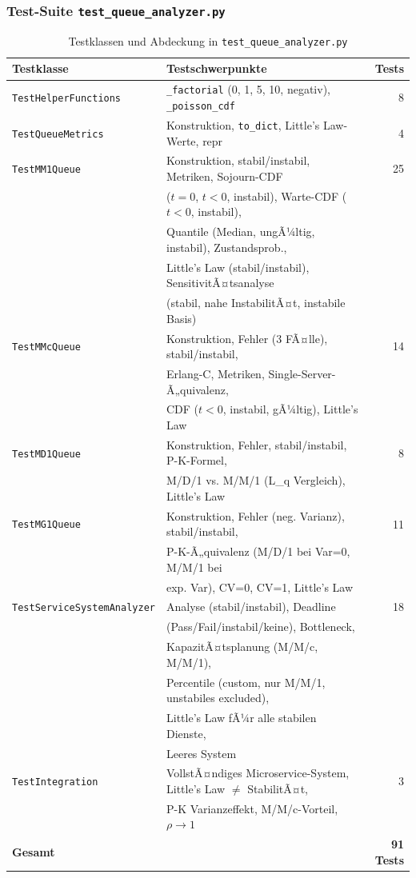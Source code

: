 ﻿\documentclass[a4paper,12pt]{scrreprt}
\theoremstyle{definition}
\begin{document}
\subsubsection{Test-Suite \texttt{test\_queue\_analyzer.py}}

\begin{table}
	\centering
	\begin{tabular}{@{}llr@{}}
		\toprule
		\textbf{Testklasse} & \textbf{Testschwerpunkte} & \textbf{Tests} \\
		\midrule
		\texttt{TestHelperFunctions} & \texttt{\_factorial} (0, 1, 5, 10, negativ),
		\texttt{\_poisson\_cdf} & 8 \\
		\texttt{TestQueueMetrics} & Konstruktion, \texttt{to\_dict},
		Little's Law-Werte, repr & 4 \\
		\texttt{TestMM1Queue} & Konstruktion, stabil/instabil, Metriken,
		Sojourn-CDF & 25 \\
		& ($t=0$, $t<0$, instabil), Warte-CDF ($t<0$, instabil), & \\
		& Quantile (Median, ungÃ¼ltig, instabil), Zustandsprob., & \\
		& Little's Law (stabil/instabil), SensitivitÃ¤tsanalyse & \\
		& (stabil, nahe InstabilitÃ¤t, instabile Basis) & \\
		\texttt{TestMMcQueue} & Konstruktion, Fehler (3 FÃ¤lle), stabil/instabil, & 14 \\
		& Erlang-C, Metriken, Single-Server-Ã„quivalenz, & \\
		& CDF ($t<0$, instabil, gÃ¼ltig), Little's Law & \\
		\texttt{TestMD1Queue} & Konstruktion, Fehler, stabil/instabil, P-K-Formel, & 8 \\
		& M/D/1 vs. M/M/1 (L\_q Vergleich), Little's Law & \\
		\texttt{TestMG1Queue} & Konstruktion, Fehler (neg. Varianz), stabil/instabil, & 11 \\
		& P-K-Ã„quivalenz (M/D/1 bei Var=0, M/M/1 bei & \\
		& exp. Var), CV=0, CV=1, Little's Law & \\
		\texttt{TestServiceSystemAnalyzer} & Analyse (stabil/instabil), Deadline & 18 \\
		& (Pass/Fail/instabil/keine), Bottleneck, & \\
		& KapazitÃ¤tsplanung (M/M/c, M/M/1), & \\
		& Percentile (custom, nur M/M/1, unstabiles excluded), & \\
		& Little's Law fÃ¼r alle stabilen Dienste, & \\
		& Leeres System & \\
		\texttt{TestIntegration} & VollstÃ¤ndiges Microservice-System,
		Little's Law $\neq$ StabilitÃ¤t, & 3 \\
		& P-K Varianzeffekt, M/M/c-Vorteil, $\rho \to 1$ & \\
		\midrule
		\textbf{Gesamt} & & \textbf{91 Tests} \\
		\bottomrule
	\end{tabular}
	\caption{Testklassen und Abdeckung in \texttt{test\_queue\_analyzer.py}}
	\label{tab:tests-queue}
\end{table}
\end{document}
